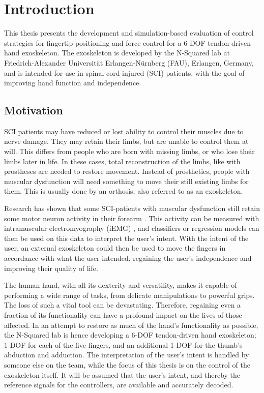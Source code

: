 \chapter{Introduction}%
\label{ch:introduction}

This thesis presents the development and simulation-based evaluation of control strategies for fingertip positioning and force control for a \mbox{6-DOF} tendon-driven hand exoskeleton. The exoskeleton is developed by the N-Squared lab at Friedrich-Alexander Universität Erlangen-Nürnberg (FAU), Erlangen, Germany, and is intended for use in spinal-cord-injured (SCI) patients, with the goal of improving hand function and independence. 

\section{Motivation}
SCI patients may have reduced or lost ability to control their muscles due to nerve damage. They may retain their limbs, but are unable to control them at will. This differs from people who are born with missing limbs, or who lose their limbs later in life. In these cases, total reconstruction of the limbs, like with prostheses are needed to restore movement. Instead of prosthetics, people with muscular dysfunction will need something to move their still existing limbs for them. This is usually done by an orthosis, also referred to as an exoskeleton. 

Research has shown that some SCI-patients with muscular dysfunction still retain some motor neuron activity in their forearm \parencite{tingWearableNeuralInterface2019}. This activity can be measured with intramuscular electromyography (iEMG) \parencite{ICSGlossary}, and classifiers or regression models can then be used on this data to interpret the user's intent. With the intent of the user, an external exoskeleton could then be used to move the fingers in accordance with what the user intended, regaining the user's independence and improving their quality of life.

The human hand, with all its dexterity and versatility, makes it capable of performing a wide range of tasks, from delicate manipulations to powerful grips. The loss of such a vital tool can be devastating. Therefore, regaining even a fraction of its functionality can have a profound impact on the lives of those affected. In an attempt to restore as much of the hand's functionality as possible, the N-Squared lab is hence developing a 6-DOF tendon-driven hand exoskeleton; \mbox{1-DOF} for each of the five fingers, and an additional \mbox{1-DOF} for the thumb's abduction and adduction. The interpretation of the user's intent is handled by someone else on the team, while the focus of this thesis is on the control of the exoskeleton itself. It will be assumed that the user's intent, and thereby the reference signals for the controllers, are available and accurately decoded.

